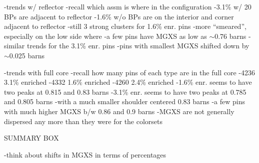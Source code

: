 -trends w/ reflector
  -recall which assm is where in the configuration
    -3.1\% w/ 20 \acp{BP} are adjacent to reflector
    -1.6\% w/o \acp{BP} are on the interior and corner adjacent to reflector
  -still 3 strong clusters for 1.6\% enr. pins
    -more ``smeared'', especially on the low side where
    -a few pins have \ac{MGXS} as low as $\sim$0.76 barns
  -similar trends for the 3.1\% enr. pins
    -pins with smallest \ac{MGXS} shifted down by $\sim$0.025 barns
  
-trends with full core
  -recall how many pins of each type are in the full core
    -4236 3.1\% enriched
    -4332 1.6\% enriched
    -4260 2.4\% enriched
  -1.6\% enr. seems to have two peaks at 0.815 and 0.83 barns
  -3.1\% enr. seems to have two peaks at 0.785 and 0.805 barns
    -with a much smaller shoulder centered 0.83 barns
    -a few pins with much higher \ac{MGXS} b/w 0.86 and 0.9 barns
  -\ac{MGXS} are not generally dispersed any more than they were for the colorsets
  

SUMMARY BOX

-think about shifts in \ac{MGXS} in terms of percentages

